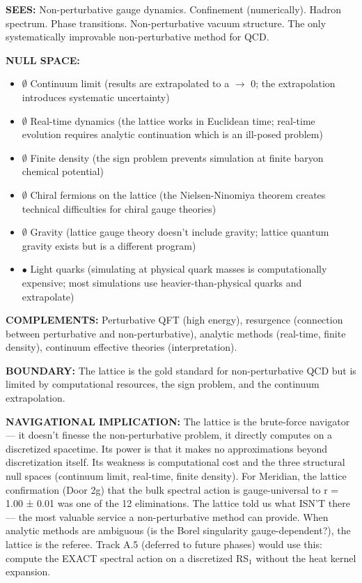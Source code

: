 \textbf{SEES:} Non-perturbative gauge dynamics. Confinement (numerically). Hadron spectrum. Phase transitions. Non-perturbative vacuum structure. The only systematically improvable non-perturbative method for QCD.


\textbf{NULL SPACE:}

\begin{itemize}[nosep,leftmargin=*]
  \item $\emptyset$ Continuum limit (results are extrapolated to a $\rightarrow$ 0; the extrapolation introduces systematic uncertainty)
  \item $\emptyset$ Real-time dynamics (the lattice works in Euclidean time; real-time evolution requires analytic continuation which is an ill-posed problem)
  \item $\emptyset$ Finite density (the sign problem prevents simulation at finite baryon chemical potential)
  \item $\emptyset$ Chiral fermions on the lattice (the Nielsen-Ninomiya theorem creates technical difficulties for chiral gauge theories)
  \item $\emptyset$ Gravity (lattice gauge theory doesn't include gravity; lattice quantum gravity exists but is a different program)
  \item $\bullet$ Light quarks (simulating at physical quark masses is computationally expensive; most simulations use heavier-than-physical quarks and extrapolate)
\end{itemize}


\textbf{COMPLEMENTS:} Perturbative QFT (high energy), resurgence (connection between perturbative and non-perturbative), analytic methods (real-time, finite density), continuum effective theories (interpretation).


\textbf{BOUNDARY:} The lattice is the gold standard for non-perturbative QCD but is limited by computational resources, the sign problem, and the continuum extrapolation.


\textbf{NAVIGATIONAL IMPLICATION:} The lattice is the brute-force navigator — it doesn't finesse the non-perturbative problem, it directly computes on a discretized spacetime. Its power is that it makes no approximations beyond discretization itself. Its weakness is computational cost and the three structural null spaces (continuum limit, real-time, finite density). For Meridian, the lattice confirmation (Door 2g) that the bulk spectral action is gauge-universal to r = 1.00 ± 0.01 was one of the 12 eliminations. The lattice told us what ISN'T there — the most valuable service a non-perturbative method can provide. When analytic methods are ambiguous (is the Borel singularity gauge-dependent?), the lattice is the referee. Track A.5 (deferred to future phases) would use this: compute the EXACT spectral action on a discretized RS$_1$ without the heat kernel expansion.


